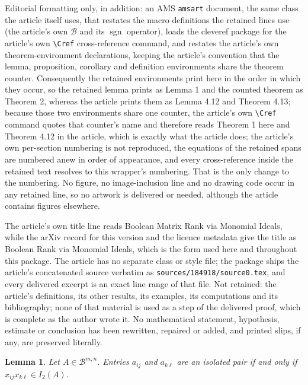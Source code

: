 \documentclass[10pt,a4paper]{amsart}
\theoremstyle{plain}
\newtheorem{lemma}[theorem]{Lemma}
\theoremstyle{definition}
\newcommand{\Bc}{\mathcal{B}}
\DeclareMathOperator{\sgn}{sgn}
\begin{document}
Editorial formatting only, in addition: an AMS \texttt{amsart} document, the same class the article itself uses, that restates the macro definitions the retained lines use (the article's own $\Bc$ and its $\sgn$ operator), loads the cleveref package for the article's own \texttt{\textbackslash Cref} cross-reference command, and restates the article's own theorem-environment declarations, keeping the article's convention that the lemma, proposition, corollary and definition environments share the theorem counter. Consequently the retained environments print here in the order in which they occur, so the retained lemma prints as Lemma 1 and the counted theorem as Theorem 2, whereas the article prints them as Lemma 4.12 and Theorem 4.13; because those two environments share one counter, the article's own \texttt{\textbackslash Cref} command quotes that counter's name and therefore reads Theorem 1 here and Theorem 4.12 in the article, which is exactly what the article does; the article's own per-section numbering is not reproduced, the equations of the retained spans are numbered anew in order of appearance, and every cross-reference inside the retained text resolves to this wrapper's numbering. That is the only change to the numbering. No figure, no image-inclusion line and no drawing code occur in any retained line, so no artwork is delivered or needed, although the article contains figures elsewhere.

The article's own title line reads Boolean Matrix Rank via Monomial Ideals, while the arXiv record for this version and the licence metadata give the title as Boolean Rank via Monomial Ideals, which is the form used here and throughout this package. The article has no separate class or style file; the package ships the article's concatenated source verbatim as \texttt{sources/184918/source0.tex}, and every delivered excerpt is an exact line range of that file. Not retained: the article's definitions, its other results, its examples, its computations and its bibliography; none of that material is used as a step of the delivered proof, which is complete as the author wrote it. No mathematical statement, hypothesis, estimate or conclusion has been rewritten, repaired or added, and printed slips, if any, are preserved literally.
\begin{lemma}\label{lem: 2x2 minors}
    Let $A\in \Bc^{m,n}$. Entries $a_{ij}$ and $a_{k\ell}$ are an isolated pair if and only if $x_{ij}x_{k\ell}\in I_2(A)$. 
\end{lemma}
\end{document}
